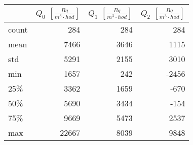 \begin{tabular}{lrrr}
\toprule
{} &  $Q_0$ $\left[\si{\frac{Bq}{m^3\cdot hod}}\right]$ &  $Q_1$ $\left[\si{\frac{Bq}{m^3\cdot hod}}\right]$ &  $Q_2$ $\left[\si{\frac{Bq}{m^3\cdot hod}}\right]$ \\
\midrule
count &                                                284 &                                                284 &                                                284 \\
mean  &                                               7466 &                                               3646 &                                               1115 \\
std   &                                               5291 &                                               2155 &                                               3010 \\
min   &                                               1657 &                                                242 &                                              -2456 \\
25\%   &                                               3362 &                                               1659 &                                               -670 \\
50\%   &                                               5690 &                                               3434 &                                               -154 \\
75\%   &                                               9669 &                                               5473 &                                               2537 \\
max   &                                              22667 &                                               8039 &                                               9848 \\
\bottomrule
\end{tabular}
